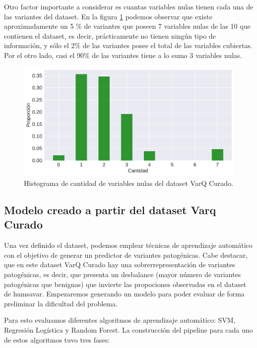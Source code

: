 Otro factor importante a considerar es cuantas variables nulas tienen cada una de las variantes del dataset. En la figura \ref{fig:nulos_varq} podemos observar que existe aproximadamente un 5 \% de variantes que poseen 7 variables nulas de las 10 que contienen el dataset, es decir, prácticamente no tienen ningún tipo de información, y sólo el 2\% de las variantes posee el total de las variables cubiertas. Por el otro lado, casi el 90\% de las variantes tiene a lo sumo 3 variables nulas.

\begin{figure}[h]
    \centering
    \includegraphics[scale=0.55]{documents/latex/figures/3/nulos_varq.pdf}
    \caption{Histograma de cantidad de variables nulas del dataset VarQ Curado.}
    \label{fig:nulos_varq}
\end{figure}

\subsection{Modelo creado a partir del dataset Varq Curado}

Una vez definido el dataset, podemos emplear técnicas de aprendizaje automático con el objetivo de generar un predictor de variantes patogénicas. Cabe destacar, que en este dataset VarQ Curado hay una sobrerrepresentación de variantes patogénicas, es decir, que presenta un desbalance (mayor número de variantes patogénicas que benignas) que invierte las propociones observadas en el dataset de humsavar. Empezaremos generando un modelo para poder evaluar de forma preliminar la dificultad del problema. 

Para esto evaluamos diferentes algoritmos de aprendizaje automático: SVM, Regresión Logística y Random Forest. La construcción del pipeline para cada uno de estos algoritmos tuvo tres fases: 

